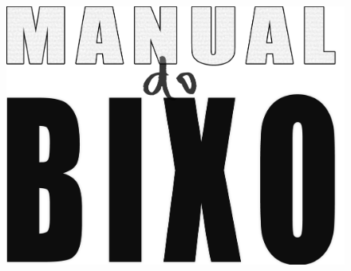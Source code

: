 \documentclass[a4paper,10pt,oldfontcommands]{memoir}
\begin{document}
\cleardoublepage
\begin{figure}[H]
    \centering
    \includegraphics[width=.85\textwidth]{img/manual_logo.png}
\end{figure}
\end{document}
